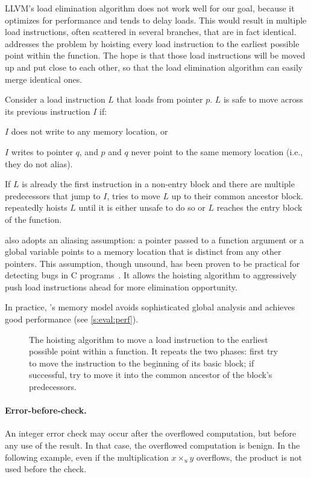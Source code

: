 LLVM's load elimination algorithm does not work well for our goal,
because it optimizes for performance and tends to delay loads.
This would result in multiple load instructions, 
often scattered in several branches, that are in fact identical.
%
\sys addresses the problem by hoisting every load instruction to
the earliest possible point within the function.  The hope is that
those load instructions will be moved up and put close to each
other, so that the load elimination algorithm can easily merge
identical ones.

Consider a load instruction $L$ that loads from pointer $p$.  $L$ is
safe to move across its previous instruction $I$ if:
\begin{CompactItemize}
\item $I$ does not write to any memory location, or
\item $I$ writes to pointer $q$, and $p$ and $q$ never point to the
same memory location (i.e., they do not alias).
\end{CompactItemize}

If $L$ is already the first instruction in a non-entry block and
there are multiple predecessors that jump to $I$, \sys tries to
move $L$ up to their common ancestor block.  \sys repeatedly hoists $L$
until it is either unsafe to do so or $L$ reaches the entry block of the
function.

\sys also adopts an aliasing assumption: a pointer passed to a
function argument or a global variable points to a memory location
that is distinct from any other pointers.  This assumption,
though unsound, has been proven to be practical for detecting bugs
in C programs~\cite{livshits:ipssa}.  It allows the hoisting algorithm
to aggressively push load instructions ahead for more elimination
opportunity.  

In practice, \sys's memory model avoids sophisticated global
analysis and achieves good performance (see \autoref{s:eval:perf}).

\begin{figure}

\caption{The hoisting algorithm to move a load instruction to the
earliest possible point within a function.  It repeats the two
phases: first try to move the instruction to the beginning of its
basic block; if successful, try to move it into the common ancestor
of the block's predecessors.}
\label{f:hoist}
\end{figure}
\fi

\paragraph{Error-before-check.}
An integer error check may occur after the overflowed computation,
but before any use of the result.  In that case, the overflowed
computation is benign.  In the following example, even if the
multiplication $x \times_u y$ overflows, the product  is
not used before the check.


